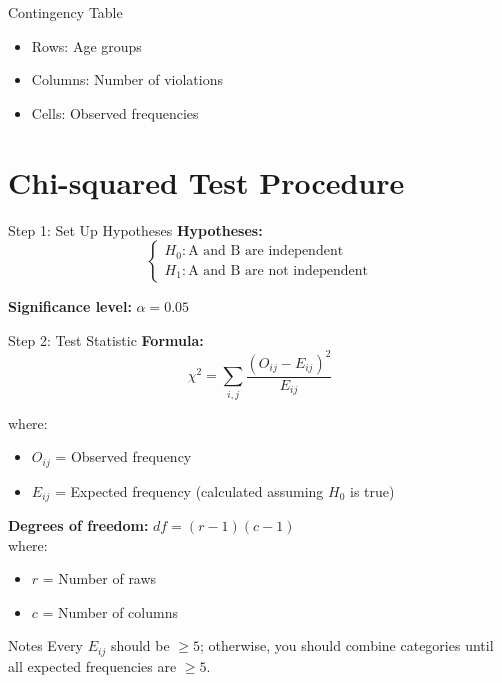\documentclass{beamer}					%
\begin{document}
\begin{frame}{Contingency Table}
    
    
    \vspace{0.5em}
    \begin{itemize}
        \item Rows: Age groups
        \item Columns: Number of violations
        \item Cells: Observed frequencies
    \end{itemize}
\end{frame}

\section{Chi-squared Test Procedure}

\begin{frame}{Step 1: Set Up Hypotheses}
    \textbf{Hypotheses:}
    $$
    \begin{cases}
    H_0: \text{A and B are independent} \\
    H_1: \text{A and B are not independent}
    \end{cases}
    $$
    
    \vspace{1em}
    \textbf{Significance level:} $\alpha = 0.05$
\end{frame}

\begin{frame}{Step 2: Test Statistic}
    \textbf{Formula:}
    $$
    \chi^2 = \sum_{i,j} \frac{(O_{ij} - E_{ij})^2}{E_{ij}}
    $$
    
    where:
    \begin{itemize}
        \item $O_{ij}$ = Observed frequency
        \item $E_{ij}$ = Expected frequency (calculated assuming $H_0$ is true)
    \end{itemize}
    
    \vspace{0.5em}
    \textbf{Degrees of freedom:} $df = (r-1)(c-1) $\\
    where:
    \begin{itemize}
        \item $r$ = Number of raws
        \item $c$ = Number of columns
    \end{itemize}
    \vspace{0.5em}
    \begin{alertblock}{Notes}
    Every $E_{ij}$ should be $\geq 5$; otherwise, you should combine categories until all expected frequencies are $\geq 5$.
    \end{alertblock}
\end{frame}
\end{document}
